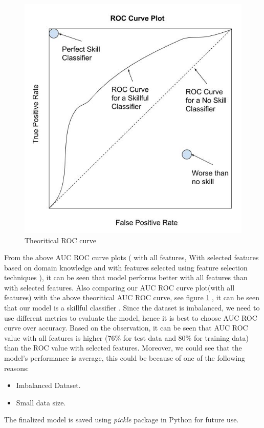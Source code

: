\documentclass[format=sigconf]{acmart}
\begin{document}
\begin{figure}[h]
    \centering
    \includegraphics[scale=0.40]{images/theoritical-ROC-Curve.jpg}
    \caption{Theoritical ROC curve}
    \label{fig:theoroc}
\end{figure}
From the above AUC ROC curve plots ( with all features, With selected features based on domain knowledge and with features 
selected using feature selection techniques ), it can be seen that model performs better with all features than with selected 
features. Also comparing our AUC ROC curve plot(with all features) with the above theoritical AUC ROC curve, see figure \ref{fig:theoroc} 
\cite{theoroc}, it can be seen that our model is a skillful classifier . Since the dataset is imbalanced, we need to use different 
metrics to evaluate the model, hence it is best to choose AUC ROC curve over accuracy. Based on the observation, it can be seen 
that AUC ROC value with all features is higher (76\% for test data and 80\% for training data) than the ROC value with selected 
features. Moreover, we could see that the model's performance is average, this could be because of one of the following reasons:
\begin{itemize}
    \item Imbalanced Dataset.
    \item Small data size.
\end{itemize}
The finalized model is saved using \textit{pickle} package in Python for future use.
\end{document}
